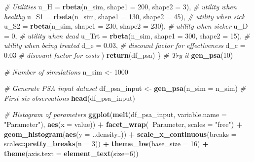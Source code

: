 \documentclass[
]{article}
\newenvironment{Shaded}{\begin{snugshade}}{\end{snugshade}}
\newcommand{\CommentTok}[1]{\textcolor[rgb]{0.56,0.35,0.01}{\textit{#1}}}
\newcommand{\DataTypeTok}[1]{\textcolor[rgb]{0.13,0.29,0.53}{#1}}
\newcommand{\DecValTok}[1]{\textcolor[rgb]{0.00,0.00,0.81}{#1}}
\newcommand{\FloatTok}[1]{\textcolor[rgb]{0.00,0.00,0.81}{#1}}
\newcommand{\KeywordTok}[1]{\textcolor[rgb]{0.13,0.29,0.53}{\textbf{#1}}}
\newcommand{\NormalTok}[1]{#1}
\newcommand{\OperatorTok}[1]{\textcolor[rgb]{0.81,0.36,0.00}{\textbf{#1}}}
\newcommand{\StringTok}[1]{\textcolor[rgb]{0.31,0.60,0.02}{#1}}
\begin{document}
\begin{Shaded}
\begin{Highlighting}[]
    \CommentTok{# Utilities}
    \DataTypeTok{u_H   =} \KeywordTok{rbeta}\NormalTok{(n_sim, }\DataTypeTok{shape1 =} \DecValTok{200}\NormalTok{, }\DataTypeTok{shape2 =} \DecValTok{3}\NormalTok{),     }\CommentTok{# utility when healthy}
    \DataTypeTok{u_S1  =} \KeywordTok{rbeta}\NormalTok{(n_sim, }\DataTypeTok{shape1 =} \DecValTok{130}\NormalTok{, }\DataTypeTok{shape2 =} \DecValTok{45}\NormalTok{),    }\CommentTok{# utility when sick}
    \DataTypeTok{u_S2  =} \KeywordTok{rbeta}\NormalTok{(n_sim, }\DataTypeTok{shape1 =} \DecValTok{230}\NormalTok{, }\DataTypeTok{shape2 =} \DecValTok{230}\NormalTok{),   }\CommentTok{# utility when sicker}
    \DataTypeTok{u_D   =} \DecValTok{0}\NormalTok{,                                          }\CommentTok{# utility when dead}
    \DataTypeTok{u_Trt =} \KeywordTok{rbeta}\NormalTok{(n_sim, }\DataTypeTok{shape1 =} \DecValTok{300}\NormalTok{, }\DataTypeTok{shape2 =} \DecValTok{15}\NormalTok{),    }\CommentTok{# utility when being treated}
    \DataTypeTok{d_e   =} \FloatTok{0.03}\NormalTok{,                                       }\CommentTok{# discount factor for effectiveness}
    \DataTypeTok{d_c   =} \FloatTok{0.03}                                        \CommentTok{# discount factor for costs}
\NormalTok{  )}
    \KeywordTok{return}\NormalTok{(df_psa)}
\NormalTok{\}}
\CommentTok{# Try it}
\KeywordTok{gen_psa}\NormalTok{(}\DecValTok{10}\NormalTok{) }

\CommentTok{# Number of simulations}
\NormalTok{n_sim <-}\StringTok{ }\DecValTok{1000}

\CommentTok{# Generate PSA input dataset}
\NormalTok{df_psa_input <-}\StringTok{ }\KeywordTok{gen_psa}\NormalTok{(}\DataTypeTok{n_sim =}\NormalTok{ n_sim)}
\CommentTok{# First six observations}
\KeywordTok{head}\NormalTok{(df_psa_input)}

\CommentTok{# Histogram of parameters}
\KeywordTok{ggplot}\NormalTok{(}\KeywordTok{melt}\NormalTok{(df_psa_input, }\DataTypeTok{variable.name =} \StringTok{"Parameter"}\NormalTok{), }\KeywordTok{aes}\NormalTok{(}\DataTypeTok{x =}\NormalTok{ value)) }\OperatorTok{+}
\StringTok{       }\KeywordTok{facet_wrap}\NormalTok{(}\OperatorTok{~}\NormalTok{Parameter, }\DataTypeTok{scales =} \StringTok{"free"}\NormalTok{) }\OperatorTok{+}
\StringTok{       }\KeywordTok{geom_histogram}\NormalTok{(}\KeywordTok{aes}\NormalTok{(}\DataTypeTok{y =}\NormalTok{ ..density..)) }\OperatorTok{+}
\StringTok{       }\KeywordTok{scale_x_continuous}\NormalTok{(}\DataTypeTok{breaks =}\NormalTok{ scales}\OperatorTok{::}\KeywordTok{pretty_breaks}\NormalTok{(}\DataTypeTok{n =} \DecValTok{3}\NormalTok{)) }\OperatorTok{+}\StringTok{ }
\StringTok{       }\KeywordTok{theme_bw}\NormalTok{(}\DataTypeTok{base_size =} \DecValTok{16}\NormalTok{) }\OperatorTok{+}\StringTok{ }
\StringTok{       }\KeywordTok{theme}\NormalTok{(}\DataTypeTok{axis.text =} \KeywordTok{element_text}\NormalTok{(}\DataTypeTok{size=}\DecValTok{6}\NormalTok{)) }


\end{Highlighting}
\end{Shaded}
\end{document}
